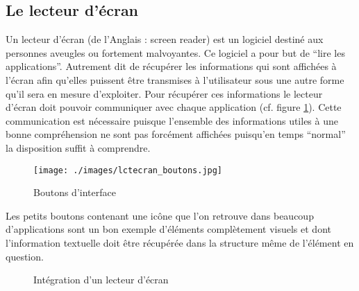 \documentclass[french,a4paper]{report}
\begin{document}
\subsection{Le lecteur d'écran}
Un lecteur d’écran (de l'Anglais : screen reader) est un logiciel destiné aux personnes aveugles
ou fortement malvoyantes. Ce logiciel a pour but de \enquote{lire les applications}. Autrement dit de
récupérer les informations qui sont affichées à l'écran afin qu'elles puissent être transmises
à l'utilisateur sous une autre forme qu'il sera en mesure d'exploiter. Pour récupérer ces
informations le lecteur d'écran doit pouvoir communiquer avec chaque application
(cf. figure \ref{integlecteur}).
Cette communication est nécessaire puisque l'ensemble des informations utiles à une bonne
compréhension ne sont pas forcément affichées puisqu'en temps \enquote{normal} la disposition suffit à
comprendre.
\newline
\begin{wrapfigure}{r}{0.45\textwidth}
\begin{center}
\texttt{[image: ./images/lctecran\_boutons.jpg]}
\end{center}
\caption{Boutons d'interface}
\vspace{-1cm}
\end{wrapfigure}
Les petits boutons contenant une icône que l'on retrouve dans beaucoup d'applications sont un bon exemple d'éléments complètement visuels et dont l'information textuelle doit être récupérée dans la structure même de l'élément en question.\newline
\vspace{1cm}
\begin{figure}[H]
\centering
{}
\caption{Intégration d'un lecteur d'écran}
\label{integlecteur}
\end{figure}
\end{document}
